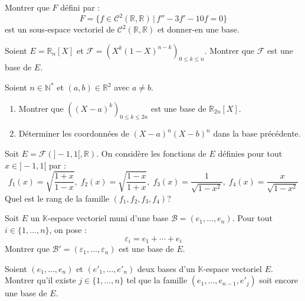 \documentclass[a4paper,twoside,french,11pt]{VcCours}
\begin{document}
\begin{Exercice}{} Montrer que $F$ défini par :
$$ F=\lbrace f \in \mathcal{C}^2(\mathbb{R}, \mathbb{R}) \, \vert \,  f''-3f'-10f= 0 \rbrace $$
est un sous-espace vectoriel de $\mathcal{C}^2(\mathbb{R}, \mathbb{R})$ et donner-en une base.
\end{Exercice} 

\begin{Exercice}{} Soient $E= \mathbb{R}_n[X]$ et $\mathcal{F} = (X^k(1-X)^{n-k})_{0 \leq k \leq n}$. Montrer que $\mathcal{F}$ est une base de $E$.
\end{Exercice}


\begin{Exercice}{} Soient $n \in \mathbb{N}^*$ et $(a,b) \in \mathbb{R}^2$ avec $a \neq b$.
\begin{enumerate}
\item Montrer que $((X-a)^k)_{0 \leq k \leq 2n}$ est une base de $\mathbb{R}_{2n}[X]$.
\item Déterminer les coordonnées de $(X-a)^n(X-b)^n$ dans la base précédente.
\end{enumerate}
\end{Exercice} 

\begin{Exercice}{} Soit $E = \mathcal{F}(]-1,1[, \mathbb{R})$. On considère les fonctions de $E$ définies pour tout $x \in ]-1,1[$ par : 
    \[
    f_1(x) = \sqrt {\frac{1 + x}{1 - x}} , \; f_2(x) = \sqrt {\frac{1 - x}{1 + x}} , \; f_3(x) = \frac{1}{\sqrt {1 - x^2}}, \; f_4(x) = \frac{x}{\sqrt {1 - x^2}}
    \]
Quel est le rang de la famille $(f_1 ,f_2 ,f_3 ,f_4)$?
\end{Exercice}

\begin{Exercice}{} Soit $E$ un $\mathbb{K}$-espace vectoriel muni d'une base $\mathcal{B} = (e_1 , \ldots ,e_n)$. Pour tout $i \in \lbrace 1, \ldots ,n \rbrace$, on pose :
$$\varepsilon_i = e_1 + \cdots + e_i$$
Montrer que $\mathcal{B}' = (\varepsilon_1 , \ldots ,\varepsilon_n)$ est une base de $E$.
\end{Exercice} 

\begin{Exercice}[$\bigstar$] Soient $(e_1 , \ldots ,e_n)$ et $(e'_1 , \ldots ,e'_n)$ deux bases d'un $\mathbb{K}$-espace vectoriel $E$. Montrer qu'il existe $j \in \lbrace 1, \ldots ,n \rbrace$ tel que la famille $(e_1 , \ldots ,e_{n - 1} ,e'_j)$ soit encore une base de $E$.
\end{Exercice}
\end{document}

